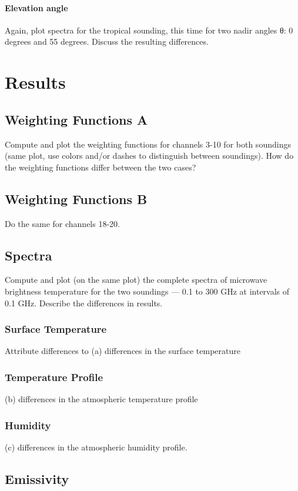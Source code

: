 \documentclass[twocol]{ametsoc}
\begin{document}
\paragraph{Elevation angle}
Again, plot spectra for the tropical sounding, this time for two nadir angles θ:  0 degrees and 55 degrees.  Discuss the resulting differences.

\section{Results}

\subsection{Weighting Functions A}
Compute and plot the weighting functions for channels 3-10 for both soundings (same plot, use colors and/or dashes to distinguish between soundings).  How do the weighting functions differ between the two cases?
\subsection{Weighting Functions B}
Do the same for channels 18-20.

\subsection{Spectra}
Compute and plot (on the same plot) the complete spectra of microwave brightness temperature for the two soundings — 0.1 to 300 GHz at intervals of 0.1 GHz.   Describe the differences in results.
\subsubsection{Surface Temperature}
Attribute differences to (a) differences in the surface temperature
\subsubsection{Temperature Profile}
(b) differences in the atmospheric temperature profile
\subsubsection{Humidity}
(c) differences in the atmospheric humidity profile.

\subsection{Emissivity}
\end{document}

